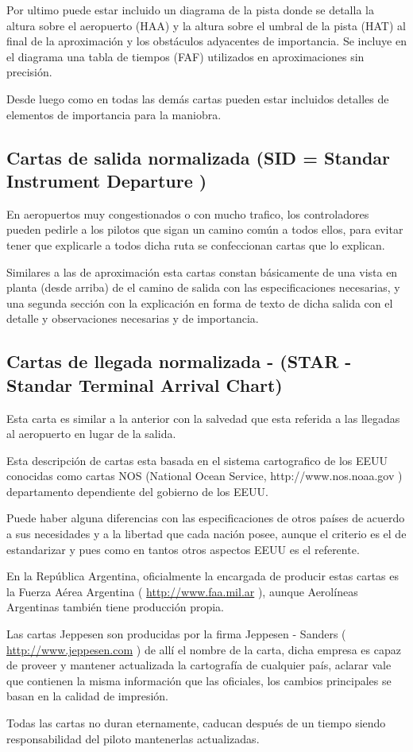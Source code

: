 Por ultimo puede estar incluido un diagrama de la pista donde se detalla la
altura sobre el aeropuerto (HAA) y la altura sobre el umbral de la pista (HAT)
al final de la aproximaci\'on y los obst\'aculos adyacentes de importancia. Se incluye en el diagrama una tabla de tiempos (FAF) utilizados en aproximaciones sin
precisi\'on.

Desde luego como en todas las dem\'as cartas pueden estar incluidos detalles de
elementos de importancia para la maniobra.

\subsection{Cartas de salida normalizada  (SID = Standar Instrument Departure )}
\label{sec:cartas-de-salida-normalizada}


En aeropuertos muy congestionados o con mucho trafico, los controladores
pueden pedirle a los pilotos que sigan un camino com\'un a todos ellos, para
evitar tener que explicarle a todos dicha ruta se confeccionan cartas que lo
explican.

Similares a las de aproximaci\'on esta cartas constan b\'asicamente de una vista
en planta (desde arriba) de el camino de salida con las especificaciones
necesarias, y una segunda secci\'on con la explicaci\'on en forma de texto de
dicha salida con el detalle y observaciones necesarias y de importancia.

\subsection{Cartas de llegada normalizada - (STAR - Standar Terminal Arrival Chart)}
\label{sec:cartas-de-llegada-normalizada}


Esta carta es similar a la anterior con la salvedad que esta referida a las
llegadas al aeropuerto en lugar de la salida.

Esta descripci\'on de cartas esta basada en el sistema cartografico de los EEUU
conocidas como cartas NOS (National Ocean Service, http://www.nos.noaa.gov )
departamento dependiente del gobierno de los EEUU.

Puede haber alguna diferencias con las especificaciones de otros pa\'ises de
acuerdo a sus necesidades y a la libertad que cada naci\'on posee, aunque el
criterio es el de estandarizar y pues como en tantos otros aspectos EEUU es el
referente.

En la Rep\'ublica Argentina, oficialmente la encargada de producir estas cartas
es la Fuerza A\'erea Argentina (
\url{http://www.faa.mil.ar} 
), aunque Aerol\'ineas
Argentinas tambi\'en tiene producci\'on propia.

Las cartas Jeppesen son producidas por la firma Jeppesen - Sanders
(
\url{http://www.jeppesen.com} 
) de all\'i el nombre de la carta, dicha empresa
es capaz de proveer y mantener actualizada la cartograf\'ia de cualquier pa\'is,
aclarar vale que contienen la misma informaci\'on que las oficiales, los cambios
principales se basan en la calidad de impresi\'on.

Todas las cartas no duran eternamente, caducan despu\'es de un tiempo siendo
responsabilidad del piloto mantenerlas actualizadas.
